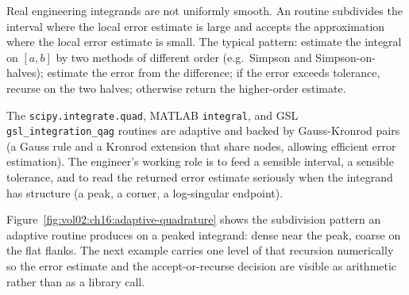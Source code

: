 Real engineering integrands are not uniformly smooth. An
 routine subdivides the interval
where the local error estimate is large and accepts the
approximation where the local error estimate is small. The
typical pattern: estimate the integral on $[a, b]$ by two methods
of different order (e.g.\ Simpson and Simpson-on-halves);
estimate the error from the difference; if the error exceeds
tolerance, recurse on the two halves; otherwise return the
higher-order estimate.

The \texttt{scipy.integrate.quad}, MATLAB \texttt{integral}, and
GSL \texttt{gsl\_integration\_qag} routines are adaptive and
backed by Gauss-Kronrod pairs (a Gauss rule and a Kronrod
extension that share nodes, allowing efficient error estimation).
The engineer's working role is to feed a sensible interval, a
sensible tolerance, and to read the returned error estimate
seriously when the integrand has structure (a peak, a corner, a
log-singular endpoint).



Figure~\ref{fig:vol02:ch16:adaptive-quadrature} shows the subdivision
pattern an adaptive routine produces on a peaked integrand: dense near the
peak, coarse on the flat flanks. The next example carries one level of that
recursion numerically so the error estimate and the accept-or-recurse
decision are visible as arithmetic rather than as a library call.

